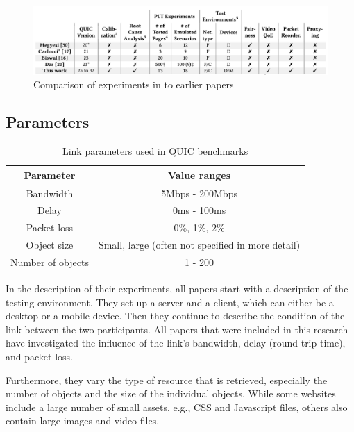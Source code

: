 \documentclass[conference]{IEEEtran}
\begin{document}
\begin{figure}[t]
\centerline{\includegraphics[width=\textwidth]{images/Kakhki overview.png}}
\caption{Comparison of experiments in \cite{Kakhki} to earlier papers}
\label{fig:Kakhki Comparison}
\end{figure}

\subsection{Parameters}

\begin{table}
\begin{center}
\begin{tabular}{|c|c|}
\hline
\textbf{Parameter} & \textbf{Value ranges} \\
\hline
Bandwidth & 5Mbps - 200Mbps\\
Delay & 0ms - 100ms \\
Packet loss & 0\%, 1\%, 2\% \\
Object size & Small, large (often not specified in more detail) \\
Number of objects & 1 - 200 \\
\hline
\end{tabular}
\end{center}
\caption{Link parameters used in QUIC benchmarks}
\label{fig:quic-parameters}
\end{table}

In the description of their experiments, all papers start with a description of the testing environment. They set up a server and a client, which can either be a desktop or a mobile device. Then they continue to describe the condition of the link between the two participants. All papers that were included in this research have investigated the influence of the link's bandwidth, delay (round trip time), and packet loss. 

Furthermore, they vary the type of resource that is retrieved, especially the number of objects and the size of the individual objects. While some websites include a large number of small assets, e.g., CSS and Javascript files, others also contain large images and video files.
\end{document}
